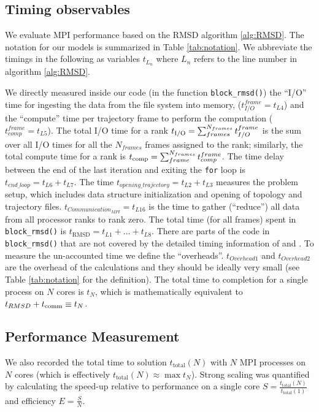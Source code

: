 \label{methods}

\subsection{Timing observables}
We evaluate MPI performance based on the RMSD algorithm \ref{alg:RMSD}. 
The notation for our models is summarized in Table \ref{tab:notation}.
We abbreviate the timings in the following as variables $t_{L_{n}}$ where $L_{n}$ refers to the line number in algorithm \ref{alg:RMSD}.

We directly measured inside our code (in the function \texttt{block\_rmsd()}) the ``I/O'' time for
ingesting the data from the file system into memory, ($t_{I/O}^{frame} = t_{L4}$) and the ``compute'' time per
trajectory frame to perform the computation ($t_{comp}^{frame} = t_{L5}$).
The total I/O time for a rank  ${t}_{\text{I/O}} = \sum_{frames}^{N_{frames}} t_{I/O}^{frame}$ is the sum over all I/O times for all the $N_{frames}$ frames assigned to the rank; similarly, the total compute time for a rank is ${t}_{\text{comp}} = \sum_{frame}^{N_{frames}} t_{comp}^{frame}$. 
The time delay between the end of the last iteration and exiting the \texttt{for} loop is $t_{end\_loop} = t_{L6}+t_{L7}$.
The time $t_{opening\_trajectory} = t_{L2}+t_{L3}$ measures the problem setup, which includes data structure initialization and opening of topology and trajectory files.
$t_{Communication_{MPI}} = t_{L16}$ is the time to gather (``reduce'') all data from all processor ranks to rank zero.
The total time (for all frames) spent in \texttt{block\_rmsd()} is $t_{\text{RMSD}} = t_{L1} + ...+ t_{L8}$. 
There are parts of the code in \texttt{block\_rmsd()} that are not covered by the detailed timing information of \tcomp and \tIO. 
To measure the un-accounted time we define the ``overheads''.
$t_{Overhead1}$ and $t_{Overhead2}$ are the overhead of the calculations and they should be ideally very small (see Table \ref{tab:notation} for the definition).  
The total time to completion for a single process on $N$ cores is $t_{N}$, which is mathematically equivalent to
$ t_{RMSD} + t_{\text{comm}} \equiv t_{N}$.

\subsection{Performance Measurement}
We also recorded the total time to solution $t_{\text{total}}(N)$ with $N$ MPI processes on $N$ cores (which is effectively
$t_{\text{total}}(N) \approx \max t_{N}$). 
Strong scaling was quantified by calculating the speed-up relative to performance on a single core $S = \frac{t_{\text{total}}(N)}{t_{\text{total}}(1)}$ and efficiency $E = \frac{S}{N}$.

